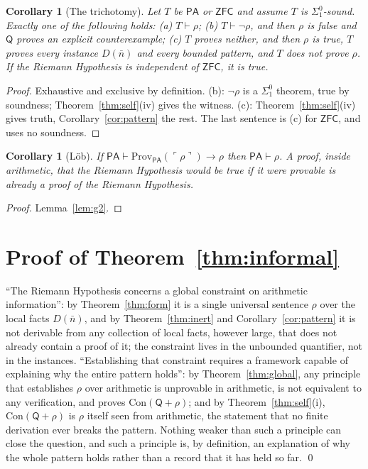 \documentclass[11pt]{article}
\newtheorem{corollary}[theorem]{Corollary}
\theoremstyle{definition}
\theoremstyle{remark}
\newcommand{\PA}{\mathsf{PA}}
\newcommand{\ZFC}{\mathsf{ZFC}}
\newcommand{\RA}{\mathsf{Q}}
\newcommand{\Prov}{\mathrm{Prov}}
\newcommand{\Con}{\mathrm{Con}}
\newcommand{\gn}[1]{\ulcorner #1\urcorner}
\newcommand{\Sigone}{\Sigma^0_1}
\begin{document}
\begin{corollary}[The trichotomy]\label{cor:tri}
Let $T$ be $\PA$ or $\ZFC$ and assume $T$ is $\Sigone$-sound. Exactly one of the following holds: (a) $T\vdash\rho$; (b) $T\vdash\neg\rho$, and then $\rho$ is false and $\RA$ proves an explicit counterexample; (c) $T$ proves neither, and then $\rho$ is true, $T$ proves every instance $D(\bar n)$ and every bounded pattern, and $T$ does not prove $\rho$. If the Riemann Hypothesis is independent of $\ZFC$, it is true.
\end{corollary}

\begin{proof}
Exhaustive and exclusive by definition. (b): $\neg\rho$ is a $\Sigone$ theorem, true by soundness; Theorem~\ref{thm:self}(iv) gives the witness. (c): Theorem~\ref{thm:self}(iv) gives truth, Corollary~\ref{cor:pattern} the rest. The last sentence is (c) for $\ZFC$, and uses no soundness.
\end{proof}

\begin{corollary}[L\"ob]\label{cor:lob}
If $\PA\vdash\Prov_\PA(\gn\rho)\to\rho$ then $\PA\vdash\rho$. A proof, inside arithmetic, that the Riemann Hypothesis would be true if it were provable is already a proof of the Riemann Hypothesis.
\end{corollary}

\begin{proof}
Lemma~\ref{lem:g2}.
\end{proof}

\section{Proof of Theorem~\ref{thm:informal}}

``The Riemann Hypothesis concerns a global constraint on arithmetic information'': by Theorem~\ref{thm:form} it is a single universal sentence $\rho$ over the local facts $D(\bar n)$, and by Theorem~\ref{thm:inert} and Corollary~\ref{cor:pattern} it is not derivable from any collection of local facts, however large, that does not already contain a proof of it; the constraint lives in the unbounded quantifier, not in the instances. ``Establishing that constraint requires a framework capable of explaining why the entire pattern holds'': by Theorem~\ref{thm:global}, any principle that establishes $\rho$ over arithmetic is unprovable in arithmetic, is not equivalent to any verification, and proves $\Con(\RA+\rho)$; and by Theorem~\ref{thm:self}(i), $\Con(\RA+\rho)$ is $\rho$ itself seen from arithmetic, the statement that no finite derivation ever breaks the pattern. Nothing weaker than such a principle can close the question, and such a principle is, by definition, an explanation of why the whole pattern holds rather than a record that it has held so far. \qed
\end{document}
